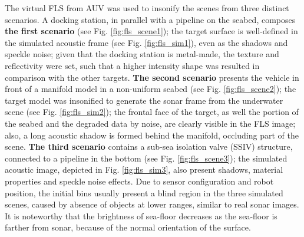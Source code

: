 \documentclass[final,5p,times]{elsarticle}
\begin{document}
The virtual FLS from AUV was used to insonify the scenes from three distinct
scenarios. A docking station, in parallel with a pipeline on the seabed,
composes \textbf{the first scenario} (see Fig. \ref{fig:fls_scene1}); the
target surface is well-defined in the simulated acoustic frame (see
Fig. \ref{fig:fls_sim1}), even as the shadows and speckle noise; given that the docking station is metal-made, the texture and reflectivity were set, such
that a higher intensity shape was resulted in comparison with the other targets.
\textbf{The second scenario} presents the vehicle in front of a manifold model
in a non-uniform seabed (see Fig. \ref{fig:fls_scene2}); the target model was
insonified to generate the sonar frame from the underwater scene (see Fig. \ref{fig:fls_sim2}); the frontal
face of the target, as well the portion of the seabed and the degraded data
by noise, are clearly visible in the FLS image; also, a long acoustic shadow
is formed behind the manifold, occluding part of the scene. \textbf{The
third scenario} contains a sub-sea isolation valve (SSIV) structure, connected
to a pipeline in the bottom (see Fig. \ref{fig:fls_scene3}); the simulated
acoustic image, depicted in Fig. \ref{fig:fls_sim3}, also present shadows,
material properties and speckle noise effects. Due to sensor configuration and
robot position, the initial bins usually present a blind region in the three
simulated scenes, caused by absence of objects at lower ranges, similar to real
sonar images. It is noteworthy that the brightness of sea-floor decreases as the sea-floor is
farther from sonar, because of the normal orientation of the surface.
\end{document}

